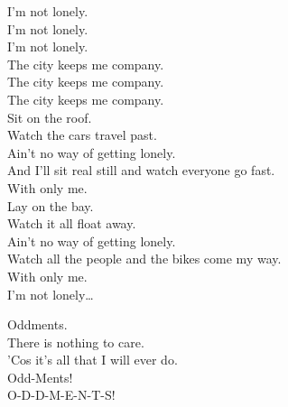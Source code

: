 


I'm not lonely. \\
I'm not lonely. \\
I'm not lonely. \\
The city keeps me company. \\
The city keeps me company. \\
The city keeps me company. \\

Sit on the roof. \\
Watch the cars travel past. \\
Ain't no way of getting lonely. \\
And I'll sit real still and watch everyone go fast. \\
With only me. \\

Lay on the bay. \\
Watch it all float away. \\
Ain't no way of getting lonely. \\
Watch all the people and the bikes come my way. \\
With only me. \\

I'm not lonely… \\





Oddments. \\
There is nothing to care. \\
'Cos it's all that I will ever do. \\
Odd-Ments! \\

O-D-D-M-E-N-T-S! \\
